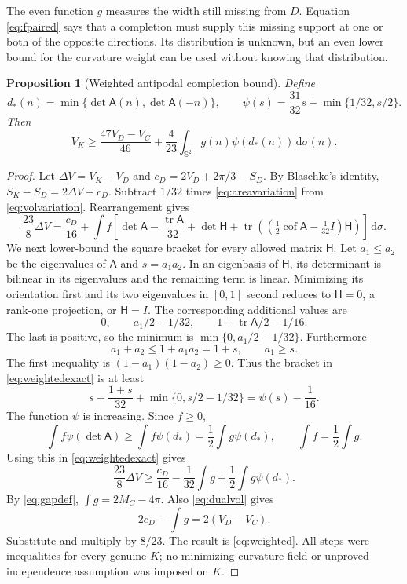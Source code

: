 \documentclass[11pt]{article}
\numberwithin{equation}{section}
\newtheorem{proposition}[theorem]{Proposition}
\theoremstyle{definition}\newtheorem{definition}[theorem]{Definition}
\theoremstyle{remark}\newtheorem{remark}[theorem]{Remark}
\newcommand{\Sph}{\mathbb S^2}
\newcommand{\tr}{\operatorname{tr}}
\newcommand{\cof}{\operatorname{cof}}
\newcommand{\dd}{\,\mathrm d}
\newcommand{\cA}{\mathsf A}
\newcommand{\cH}{\mathsf H}
\begin{document}
The even function $g$ measures the width still missing from $D$. Equation
\cref{eq:fpaired} says that a completion must supply this missing support
at one or both of the opposite directions. Its distribution is unknown, but
an even lower bound for the curvature weight can be used without knowing
that distribution.

\begin{proposition}[Weighted antipodal completion bound]\label{prop:weighted}
Define
\[
 d_*(n)=\min\{\det\cA(n),\det\cA(-n)\},\qquad
 \psi(s)=\frac{31}{32}s+\min\{1/32,s/2\}.
\]
Then
\begin{equation}\label{eq:weighted}
 \boxed{V_K\ge\frac{47V_D-V_C}{46}
       +\frac4{23}\int_{\Sph}g(n)\psi(d_*(n))\dd\sigma(n).}
\end{equation}
\end{proposition}
\begin{proof}
Let $\Delta V=V_K-V_D$ and $c_D=2V_D+2\pi/3-S_D$. By Blaschke's identity,
$S_K-S_D=2\Delta V+c_D$. Subtract $1/32$ times
\cref{eq:areavariation} from \cref{eq:volvariation}. Rearrangement gives
\begin{equation}\label{eq:weightedexact}
 \frac{23}{8}\Delta V=\frac{c_D}{16}
 +\int f\left[\det\cA-\frac{\tr\cA}{32}
     +\det\cH+\tr\left((\tfrac12\cof\cA-\tfrac1{32}I)\cH\right)
        \right]\dd\sigma.
\end{equation}
We next lower-bound the square bracket for every allowed matrix $\cH$.
Let $a_1\le a_2$ be the eigenvalues of $\cA$ and $s=a_1a_2$. In an
eigenbasis of $\cH$, its determinant is bilinear in its eigenvalues and the
remaining term is linear. Minimizing its orientation first and its two
eigenvalues in $[0,1]$ second reduces to $\cH=0$, a rank-one projection,
or $\cH=I$. The corresponding additional values are
\[
 0,\qquad a_1/2-1/32,\qquad 1+\tr\cA/2-1/16.
\]
The last is positive, so the minimum is $\min\{0,a_1/2-1/32\}$.
Furthermore
\[
 a_1+a_2\le1+a_1a_2=1+s,\qquad a_1\ge s.
\]
The first inequality is $(1-a_1)(1-a_2)\ge0$. Thus the bracket in
\cref{eq:weightedexact} is at least
\[
 s-\frac{1+s}{32}+\min\{0,s/2-1/32\}
 =\psi(s)-\frac1{16}.
\]
The function $\psi$ is increasing. Since $f\ge0$,
\[
 \int f\psi(\det\cA)\ge\int f\psi(d_*)
 =\frac12\int g\psi(d_*),\qquad \int f=\frac12\int g.
\]
Using this in \cref{eq:weightedexact} gives
\begin{equation}\label{eq:weightedpaired}
 \frac{23}{8}\Delta V\ge\frac{c_D}{16}
     -\frac1{32}\int g+\frac12\int g\psi(d_*).
\end{equation}
By \cref{eq:gapdef}, $\int g=2M_C-4\pi$. Also
\cref{eq:dualvol} gives
\[
 2c_D-\int g=2(V_D-V_C).
\]
Substitute and multiply by $8/23$. The result is \cref{eq:weighted}.
All steps were inequalities for every genuine $K$; no minimizing curvature
field or unproved independence assumption was imposed on $K$.
\end{proof}
\end{document}
